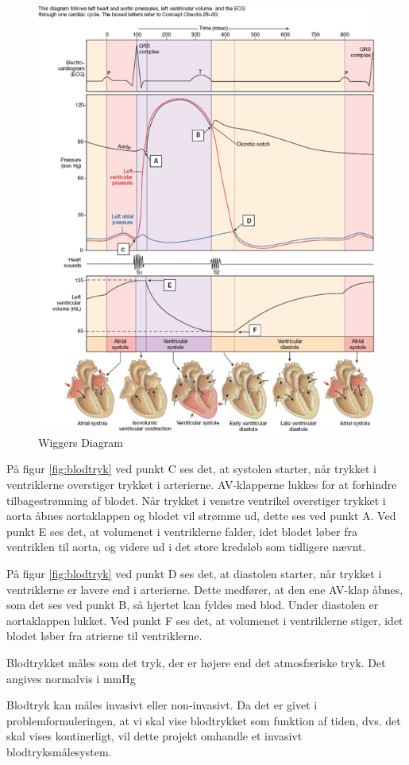 \begin{figure}[h!]
	\centering
	\includegraphics[width=0.9\linewidth]{Teori/Fysiologi/Blodtryk}
	\caption{Wiggers Diagram \cite{WiggersDiagram}}
	\label{fig:blodtryk}
\end{figure}

På figur \vref{fig:blodtryk} ved punkt C ses det, at systolen starter, når trykket i ventriklerne overstiger trykket i arterierne. AV-klapperne lukkes for at forhindre tilbagestrømning af blodet. Når trykket i venstre ventrikel overstiger trykket i aorta åbnes aortaklappen og blodet vil strømme ud, dette ses ved punkt A. Ved punkt E ses det, at volumenet i ventriklerne falder, idet blodet løber fra ventriklen til aorta, og videre ud i det store kredsløb som tidligere nævnt. 

På figur \vref{fig:blodtryk} ved punkt D ses det, at diastolen starter, når trykket i ventriklerne er lavere end i arterierne. Dette medfører, at den ene AV-klap åbnes, som det ses ved punkt B, så hjertet kan fyldes med blod. Under diastolen er aortaklappen lukket. Ved punkt F ses det, at volumenet i ventriklerne stiger, idet blodet løber fra atrierne til ventriklerne. 

Blodtrykket måles som det tryk, der er højere end det atmosfæriske tryk. Det angives normalvis i mmHg

Blodtryk kan måles invasivt eller non-invasivt. Da det er givet i problemformuleringen, at vi skal vise blodtrykket som funktion af tiden, dvs. det skal vises kontinerligt, vil dette projekt omhandle et invasivt blodtryksmålesystem. 
